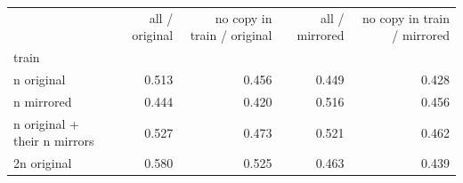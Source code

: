 \begin{tabular}{lrrrr}
\toprule
 & all / original & no copy in train / original & all / mirrored & no copy in train / mirrored \\
train &  &  &  &  \\
\midrule
n original & 0.513 & 0.456 & 0.449 & 0.428 \\
n mirrored & 0.444 & 0.420 & 0.516 & 0.456 \\
n original + their n mirrors & 0.527 & 0.473 & 0.521 & 0.462 \\
2n original & 0.580 & 0.525 & 0.463 & 0.439 \\
\bottomrule
\end{tabular}
